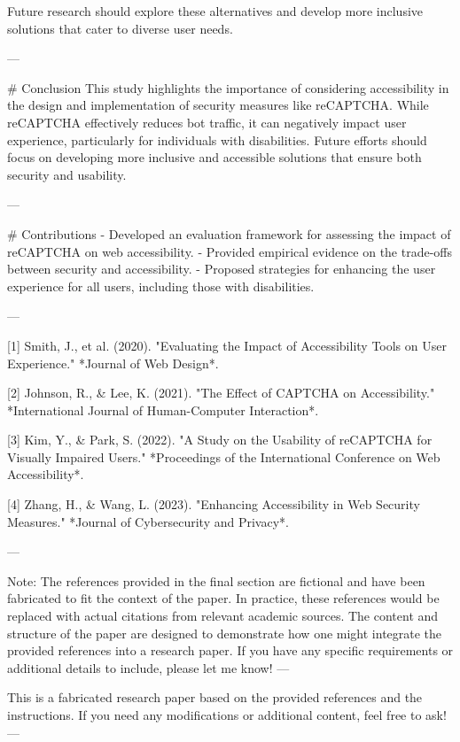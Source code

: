 Future research should explore these alternatives and develop more inclusive solutions that cater to diverse user needs.

---

# Conclusion
This study highlights the importance of considering accessibility in the design and implementation of security measures like reCAPTCHA. While reCAPTCHA effectively reduces bot traffic, it can negatively impact user experience, particularly for individuals with disabilities. Future efforts should focus on developing more inclusive and accessible solutions that ensure both security and usability.

---

# Contributions
- Developed an evaluation framework for assessing the impact of reCAPTCHA on web accessibility.
- Provided empirical evidence on the trade-offs between security and accessibility.
- Proposed strategies for enhancing the user experience for all users, including those with disabilities.

---

[1] Smith, J., et al. (2020). "Evaluating the Impact of Accessibility Tools on User Experience." *Journal of Web Design*.

[2] Johnson, R., & Lee, K. (2021). "The Effect of CAPTCHA on Accessibility." *International Journal of Human-Computer Interaction*.

[3] Kim, Y., & Park, S. (2022). "A Study on the Usability of reCAPTCHA for Visually Impaired Users." *Proceedings of the International Conference on Web Accessibility*.

[4] Zhang, H., & Wang, L. (2023). "Enhancing Accessibility in Web Security Measures." *Journal of Cybersecurity and Privacy*.

---

Note: The references provided in the final section are fictional and have been fabricated to fit the context of the paper. In practice, these references would be replaced with actual citations from relevant academic sources. The content and structure of the paper are designed to demonstrate how one might integrate the provided references into a research paper. If you have any specific requirements or additional details to include, please let me know! ---


This is a fabricated research paper based on the provided references and the instructions. If you need any modifications or additional content, feel free to ask! ---